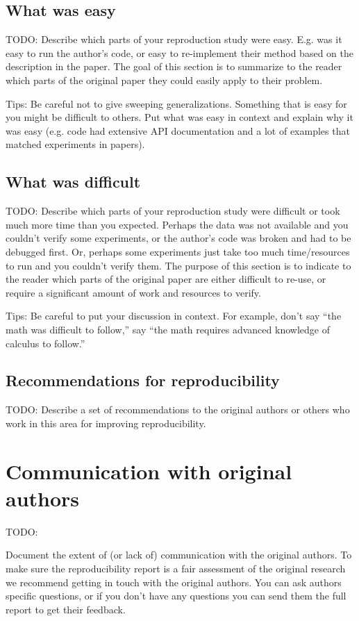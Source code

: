 \documentclass[11pt,a4paper]{article}
\begin{document}
\subsection{What was easy}
TODO: 
Describe which parts of your reproduction study were easy. E.g. was it easy to run the author's code, or easy to re-implement their method based on the description in the paper. The goal of this section is to summarize to the reader which parts of the original paper they could easily apply to their problem. 

Tips: Be careful not to give sweeping generalizations. Something that is easy for you might be difficult to others. Put what was easy in context and explain why it was easy (e.g. code had extensive API documentation and a lot of examples that matched experiments in papers). 

\subsection{What was difficult}
TODO: 
Describe which parts of your reproduction study were difficult or took much more time than you expected. Perhaps the data was not available and you couldn't verify some experiments, or the author's code was broken and had to be debugged first. Or, perhaps some experiments just take too much time/resources to run and you couldn't verify them. The purpose of this section is to indicate to the reader which parts of the original paper are either difficult to re-use, or require a significant amount of work and resources to verify. 

Tips: Be careful to put your discussion in context. For example, don't say ``the math was difficult to follow,'' say ``the math requires advanced knowledge of calculus to follow.'' 

\subsection{Recommendations for reproducibility}
TODO: 
Describe a set of recommendations to the original authors or others who work in this area for improving reproducibility.

\section{Communication with original authors}
TODO: 

Document the extent of (or lack of) communication with the original authors. To make sure the reproducibility report is a fair assessment of the original research we recommend getting in touch with the original authors. You can ask authors specific questions, or if you don't have any questions you can send them the full report to get their feedback.





\end{document}
